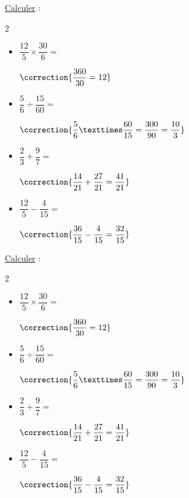 \documentclass{automatisme}
\begin{document}
\newcommand{\Calculs}{
	\begin{frame}
		\uline{Calculer} :

		\begin{multicols}{2}
			\begin{itemize}
				\item $\dfrac{12}{5} × \dfrac{30}{6} = $\vspace{0.5em}

				      $\correction{\dfrac{360}{30} = 12}$
				\item $\dfrac{5}{6} ÷ \dfrac{15}{60} =$\vspace{0.5em}

				      $\correction{\dfrac{5}{6} × \dfrac{60}{15} = \dfrac{300}{90} = \dfrac{10}{3}}$
				\item $\dfrac{2}{3} + \dfrac{9}{7} =$\vspace{0.5em}

				      $\correction{\dfrac{14}{21} + \dfrac{27}{21} = \dfrac{41}{21}}$
				\item $\dfrac{12}{5} - \dfrac{4}{15} =$\vspace{0.5em}

				      $\correction{\dfrac{36}{15} - \dfrac{4}{15} = \dfrac{32}{15}}$
			\end{itemize}
		\end{multicols}
	\end{frame}
}

\Calculs

\newcommand{\makeCorrection}{}
\Calculs
\end{document}
